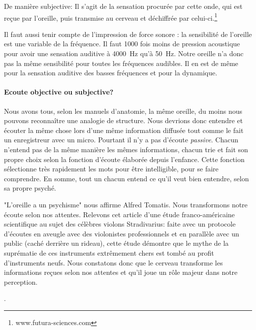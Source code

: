 De manière subjective:	
	Il s'agit de la sensation procurée
	par cette onde, qui est reçue par l'oreille, puis transmise au cerveau
	et déchiffrée par celui-ci.\footnote{www.futura-sciences.com } 

Il faut aussi tenir compte de  l'impression de force sonore : la sensibilité de l'oreille
est une variable de la fréquence. Il faut 1000 fois moins de pression
acoustique pour avoir une sensation auditive à \SI{4000}{\hertz} qu'à \SI{50}{\hertz}.
Notre oreille n'a donc pas la même sensibilité pour toutes
les fréquences audibles. Il en est de même pour la sensation auditive
des basses fréquences et pour la dynamique. 

\paragraph{Ecoute objective ou subjective?}

Nous avons tous,
selon les manuels d'anatomie, la même
oreille, du moins nous pouvons reconnaître une analogie de structure. Nous devrions donc entendre et écouter la même chose
lors d'une même information diffusée tout comme le fait un enregistreur avec un micro. Pourtant il n'y a pas d'écoute \emph{passive}. Chacun n'entend pas de la même manière les mêmes
informations, chacun trie et fait son propre choix selon la fonction
d'écoute élaborée depuis l'enfance. Cette fonction sélectionne très
rapidement les mots pour être intelligible, pour se faire comprendre. En somme, tout un chacun entend ce qu'il veut bien
entendre, selon sa propre psyché.


"L'oreille a un psychisme" nous affirme Alfred Tomatis.
Nous transformons notre écoute selon nos attentes. Relevons cet 
article d'une 
étude franco-américaine scientifique
\autocite{fritz_stradivarius} au sujet des célèbres violons
Stradivarius: faite avec un protocole 
d'écoutes en aveugle avec
des violonistes professionnels et en parallèle avec un public (caché
derrière un rideau), cette étude démontre que le mythe de la suprématie
de ces instruments extrêmement chers est tombé au profit d'instruments
neufs. Nous constatons donc que le cerveau 
transforme les informations reçues selon nos attentes et qu'il joue un
rôle majeur dans notre perception.

\autocite{lemonde.fr:stradivarius}.
% 
\autocite[p. 43]{roque:lecoute}


